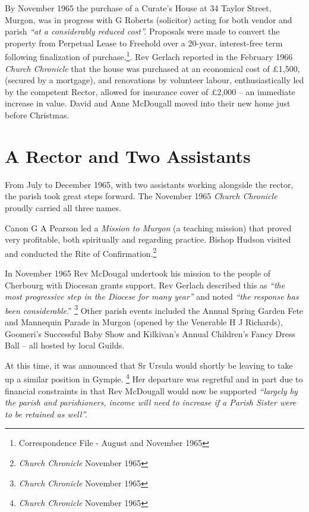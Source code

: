 By November 1965 the purchase of a Curate's House at 34 Taylor Street, Murgon, was in progress with G Roberts (solicitor) acting for both vendor and parish \emph{``at a considerably reduced cost''.} Proposals were made to convert the property from Perpetual Lease to Freehold over a 20-year, interest-free term following finalization of purchase.\footnote{Correspondence File - August and November 1965}. Rev Gerlach reported in the February 1966 \emph{Church Chronicle} that the house was purchased at an economical cost of \pounds1,500, (secured by a mortgage), and renovations by volunteer labour, enthusiastically led by the competent Rector, allowed for insurance cover of \pounds2,000 -- an immediate increase in value. David and Anne McDougall moved into their new home just before Christmas.


\section{A Rector and Two Assistants}



From July to December 1965, with two assistants working alongside the rector, the parish took great steps forward. The November 1965 \emph{Church Chronicle} proudly carried all three names.



Canon G A Pearson led a \emph{Mission to Murgon} (a teaching mission) that proved very profitable, both spiritually and regarding practice. Bishop Hudson visited and conducted the Rite of Confirmation.\footnote{\emph{Church Chronicle} November 1965}


In November 1965 Rev McDougal undertook his mission to the people of Cherbourg with Diocesan grants support. Rev Gerlach described this as \emph{``the most progressive step in the Diocese for many year''} and noted \emph{``the response has been considerable}.'' \footnote{\emph{Church Chronicle} November 1965} Other parish events included the Annual Spring Garden Fete and Mannequin Parade in Murgon (opened by the Venerable H J Richards), Goomeri's Successful Baby Show and Kilkivan's Annual Children's Fancy Dress Ball -- all hosted by local Guilds.


At this time, it was announced that Sr Ursula would shortly be leaving to take up a similar position in Gympie. \footnote{\emph{Church Chronicle} November 1965} Her departure was regretful and in part due to financial constraints in that Rev McDougall would now be supported \emph{``largely by the parish and parishioners, income will need to increase if a Parish Sister were to be retained as well''.}


